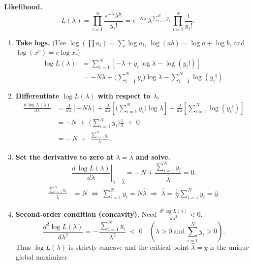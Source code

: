 \documentclass[border=3bp]{standalone}
\begin{document}
\begin{minipage}{4.5in}
\textbf{Likelihood.}
\[
L(\lambda)=\prod_{i=1}^{N}\frac{e^{-\lambda}\lambda^{y_i}}{y_i!}
= e^{-N\lambda}\,\lambda^{\sum_{i=1}^{N}y_i}\,\prod_{i=1}^{N}\frac{1}{y_i!}.
\]

\begin{enumerate}\setlength{\itemsep}{0.25em}

\item \textbf{Take logs.} (Use $\log(\prod a_i)=\sum\log a_i$, $\log(ab)=\log a+\log b$, and $\log(x^c)=c\log x$.)
\begingroup\setlength{\jot}{1.5pt}
\[
\begin{aligned}
\log L(\lambda)
&= \sum_{i=1}^{N}\left[-\lambda + y_i\log\lambda - \log(y_i!)\right] \\
&= -N\lambda + \Big(\sum_{i=1}^{N}y_i\Big)\log\lambda - \sum_{i=1}^{N}\log(y_i!).
\end{aligned}
\]
\endgroup

\item \textbf{Differentiate $\log L(\lambda)$ with respect to $\lambda$.}
\begingroup\setlength{\jot}{1.5pt}
\[
\begin{aligned}
\frac{d\,\log L(\lambda)}{d\lambda}
&= \frac{d}{d\lambda}\!\left[-N\lambda\right]
  + \frac{d}{d\lambda}\!\left[\Big(\sum_{i=1}^{N}y_i\Big)\log\lambda\right]
  - \frac{d}{d\lambda}\!\left[\sum_{i=1}^{N}\log(y_i!)\right] \\
&= -N \;+\; \Big(\sum_{i=1}^{N}y_i\Big)\frac{1}{\lambda} \;+\; 0 \\
&= -\,N \;+\; \frac{\sum_{i=1}^{N}y_i}{\lambda}.
\end{aligned}
\]
\endgroup

\item \textbf{Set the derivative to zero at $\lambda=\hat{\lambda}$ and solve.}
\[
\left.\frac{d\,\log L(\lambda)}{d\lambda}\right|_{\lambda=\hat{\lambda}}
= -\,N + \frac{\sum_{i=1}^{N}y_i}{\hat{\lambda}} = 0.
\]
\begingroup\setlength{\jot}{1.5pt}
\[
\begin{aligned}
\frac{\sum_{i=1}^{N}y_i}{\hat{\lambda}} &= N
\;\Longleftrightarrow\;
\sum_{i=1}^{N}y_i = N\hat{\lambda}
\;\Longrightarrow\;
\hat{\lambda} = \frac{1}{N}\sum_{i=1}^{N}y_i
= \overline{y}.
\end{aligned}
\]
\endgroup

\item \textbf{Second-order condition (concavity).} Need $\displaystyle \frac{d^{2}\!\log L(\lambda)}{d\lambda^{2}}<0$.
\[
\frac{d^{2}\!\log L(\lambda)}{d\lambda^{2}}
= -\,\frac{\sum_{i=1}^{N}y_i}{\lambda^{2}}
\;<\;0 \quad (\lambda>0\ \text{and}\ \textstyle\sum_{i=1}^{N}y_i>0).
\]
Thus $\log L(\lambda)$ is strictly concave and the critical point $\hat{\lambda}=\overline{y}$ is the unique global maximizer.
\end{enumerate}
\end{minipage}
\end{document}
